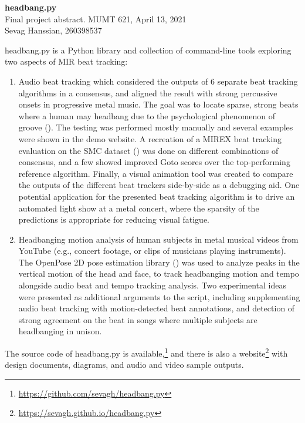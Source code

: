 \documentclass[letter,12pt]{report}
\begin{document}
\noindent\Large{\textbf{headbang.py}}\\
\large{Final project abstract. MUMT 621, April 13, 2021}\\
\large{Sevag Hanssian, 260398537}

\noindent\hrulefill

\vspace{2em}

headbang.py is a Python library and collection of command-line tools exploring two aspects of MIR beat tracking:

\begin{enumerate}
	\item
		Audio beat tracking which considered the outputs of 6 separate beat tracking algorithms in a consensus, and aligned the result with strong percussive onsets in progressive metal music. The goal was to locate sparse, strong beats where a human may headbang due to the psychological phenomenon of groove (\cite{groove}). The testing was performed mostly manually and several examples were shown in the demo website. A recreation of a MIREX beat tracking evaluation on the SMC dataset (\cite{smcdataset}) was done on different combinations of consensus, and a few showed improved Goto scores over the top-performing reference algorithm. Finally, a visual animation tool was created to compare the outputs of the different beat trackers side-by-side as a debugging aid. One potential application for the presented beat tracking algorithm is to drive an automated light show at a metal concert, where the sparsity of the predictions is appropriate for reducing visual fatigue. 
	\item
		Headbanging motion analysis of human subjects in metal musical videos from YouTube (e.g., concert footage, or clips of musicians playing instruments). The OpenPose 2D pose estimation library (\cite{openpose}) was used to analyze peaks in the vertical motion of the head and face, to track headbanging motion and tempo alongside audio beat and tempo tracking analysis. Two experimental ideas were presented as additional arguments to the script, including supplementing audio beat tracking with motion-detected beat annotations, and detection of strong agreement on the beat in songs where multiple subjects are headbanging in unison.
\end{enumerate}

The source code of headbang.py is available,\footnote{\url{https://github.com/sevagh/headbang.py}} and there is also a website\footnote{\url{https://sevagh.github.io/headbang.py}} with design documents, diagrams, and audio and video sample outputs.

\vfill
\clearpage

\nocite{*}
\printbibheading[title={\vspace{-3.5em}References},heading=bibnumbered]
\vspace{-1.5em}
\printbibliography[heading=none]
\end{document}
